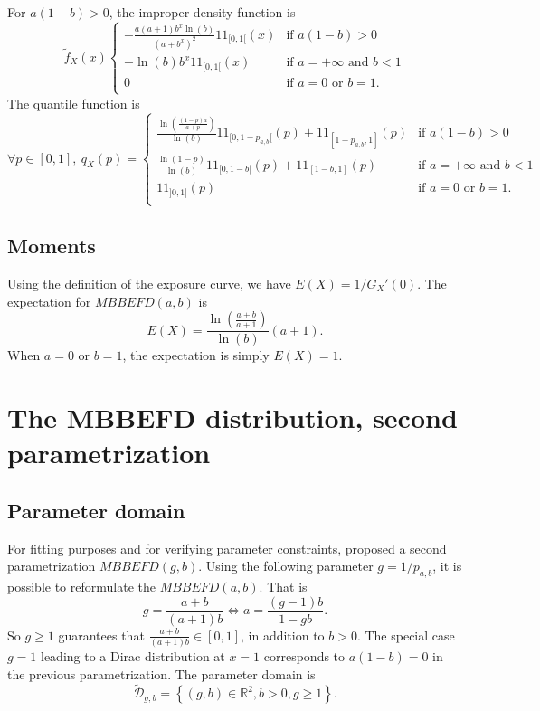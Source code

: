 \documentclass[article, nojss]{jss}
\newcommand{\ind}{1\!\!1}
\newcommand{\R}{\mathbb R}
\newcommand{\calD}{\mathcal D}
\newcommand{\systL}{\left\{\begin{array}{ll}}
\newcommand{\systR}{\end{array}\right.}
\begin{document}
For $a(1-b)>0$, the improper density function is 
\begin{equation}
\tilde f_X(x) 
\systL
-\frac{a(a+1)b^x\ln(b)}{(a+b^x)^2}\ind_{[0,1[}(x) & \text{if } a(1-b) >0 \\
-\ln(b)b^x\ind_{[0,1[}(x)  & \text{if } a=+\infty \text{ and } b<1 \\
0 & \text{if } a=0 \text{ or } b=1. \\
\systR
\label{impd:mbbefd:ab}
\end{equation}
The quantile function is 
\begin{equation}
\forall p\in [0,1],~
q_X(p) = 
\systL
\frac{\ln\left(\frac{(1-p)a}{a+p}\right)}{\ln(b)} \ind_{[0,1-p_{a,b}[}(p) + \ind_{[1-p_{a,b},1]}(p)  & \text{if } a(1-b) >0 \\
\frac{\ln(1-p)}{\ln(b)}\ind_{[0,1-b[}(p) + \ind_{[1-b,1]}(p)   & \text{if } a=+\infty \text{ and } b<1 \\
\ind_{]0,1]}(p) & \text{if } a=0 \text{ or } b=1. \\
\systR
\label{q:mbbefd:ab}
\end{equation}


\subsection{Moments}
Using the definition of the exposure curve, we have
$E(X) = 1/G_X'(0).$
The expectation for $MBBEFD(a,b)$ is
$$
E(X)=\frac{\ln(\frac{a+b}{a+1})}{\ln(b)} (a+1).
$$
When $a=0$ or $b=1$, the expectation is simply $E(X)=1$.



\section{The MBBEFD distribution, second parametrization}\label{sec:mbbefd2p}

\subsection{Parameter domain}

For fitting purposes and for verifying parameter constraints, 
\cite{bernegger97} proposed a second parametrization $MBBEFD(g,b)$.
Using the following parameter $g=1/p_{a,b}$, it is possible to reformulate the $MBBEFD(a,b)$.
That is
$$
g= \frac{a+b}{(a+1)b}
\Leftrightarrow
a=\frac{(g-1)b}{1-gb}.
$$
So $g\geq 1$ guarantees that $\frac{a+b}{(a+1)b}\in [0,1]$, in addition to $b>0$.
The special case $g=1$ leading to a Dirac distribution at $x=1$ corresponds to $a(1-b)=0$ in the previous parametrization.
The parameter domain is
$$
\widetilde{\calD}_{g,b}= \left\{
(g,b)\in\R^2, b>0, g\geq 1
\right\}.
$$
\end{document}
